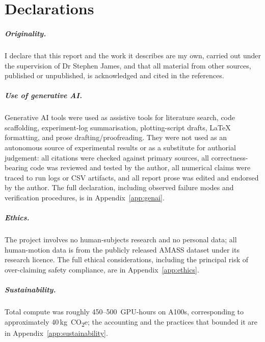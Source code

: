 \documentclass[11pt,a4paper]{report}
\begin{document}
\clearpage
\chapter*{Declarations}

\paragraph{Originality.}
I declare that this report and the work it describes are my own,
carried out under the supervision of Dr Stephen James, and that all
material from other sources, published or unpublished, is
acknowledged and cited in the references.

\paragraph{Use of generative AI.}
Generative AI tools were used as assistive tools for literature search,
code scaffolding, experiment-log summarisation, plotting-script drafts,
\LaTeX{} formatting, and prose drafting/proofreading. They were not
used as an autonomous source of experimental results or as a substitute
for authorial judgement: all citations were checked against primary
sources, all correctness-bearing code was reviewed and tested by the
author, all numerical claims were traced to run logs or CSV artifacts,
and all report prose was edited and endorsed by the author. The full
declaration, including observed failure modes and verification
procedures, is in Appendix~\ref{app:genai}.

\paragraph{Ethics.}
The project involves no human-subjects research and no personal
data; all human-motion data is from the publicly released AMASS
dataset under its research licence. The full ethical considerations,
including the principal risk of over-claiming safety compliance, are
in Appendix~\ref{app:ethics}.

\paragraph{Sustainability.}
Total compute was roughly 450--500~GPU-hours on A100s,
corresponding to approximately 40\,kg~CO\textsubscript{2}e; the
accounting and the practices that bounded it are in
Appendix~\ref{app:sustainability}.
\end{document}
